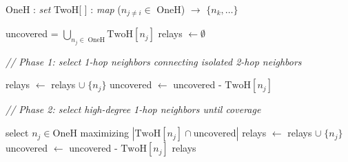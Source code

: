 
\begin{algorithm}[t]
\begin{footnotesize}
	\begin{algorithmic}[1]

	\BeginInput
		\State OneH : \emph{set} 
		\State TwoH[ ] : \emph{map} ($n_{j\neq i}\in$ OneH) $\rightarrow$ $\{n_k,\dots\}$ 
	\EndInput
	
	\smallskip
	
		\State uncovered = $\bigcup\limits_{n_j\in \; \text{OneH}} \text{TwoH}[n_j]$
		\State relays $\gets \emptyset$
		
		\noindent \emph{// Phase 1: select 1-hop neighbors connecting isolated 2-hop neighbors}
		
				\State relays $\gets$ relays $\cup \; \{n_j\}$
				\State uncovered $\gets$ uncovered - $\text{TwoH}[n_j]$
			\EndIf
		\EndFor
		
		\noindent \emph{// Phase 2: select high-degree 1-hop neighbors until coverage}
				
		
	
			\State select $n_j \in \text{OneH}$ maximizing $|\text{TwoH}[n_j] \cap \text{uncovered}|$
			\State relays $\gets$ relays $\cup \; \{n_j\}$
			\State uncovered $\gets$ uncovered - $\text{TwoH}[n_j]$
		\EndWhile
		\State \Return relays
		
	\EndProcedure
\end{algorithmic}	
\end{footnotesize}
\caption{Selection of relays at node $n_i$ with MPR}\label{algorithm:mpr}
\end{algorithm}

